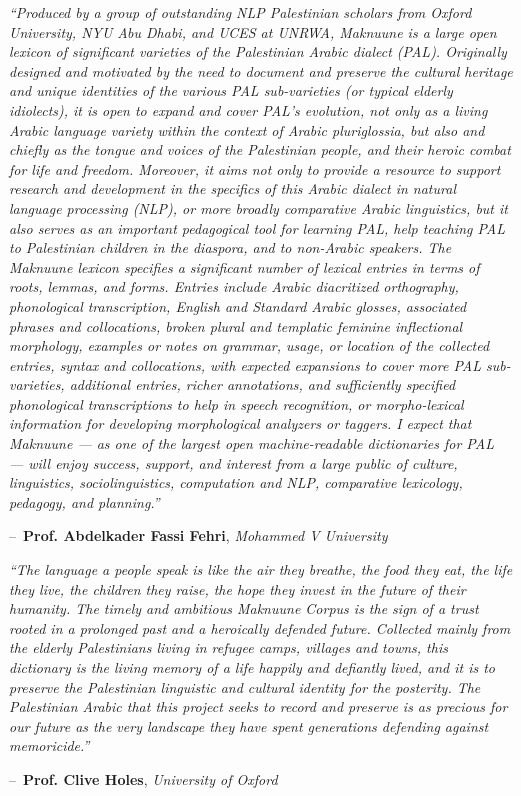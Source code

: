\documentclass[11pt]{book}
\makeatletter
\newenvironment{chapquote}[2][2em]
  {\setlength{\@tempdima}{#1}%
   \def\chapquote@author{#2}%
   \parshape 1 \@tempdima \dimexpr\textwidth-2\@tempdima\relax%
   \itshape}
  {\par\normalfont\hfill--\ \chapquote@author\hspace*{\@tempdima}\par\bigskip}
\makeatother
\begin{document}
\begin{chapquote}{\textbf{Prof.  Abdelkader Fassi Fehri}, \textit{Mohammed V University
}}
``Produced by a group of outstanding NLP Palestinian scholars from Oxford University, NYU Abu Dhabi, and UCES at UNRWA, Maknuune is a large open lexicon of significant varieties of the Palestinian Arabic dialect (PAL). Originally designed and motivated by the need to document and preserve the cultural heritage and unique identities of the various PAL sub-varieties (or typical elderly idiolects), it is open to expand and cover PAL’s evolution, not only as a living Arabic language variety within the context of Arabic pluriglossia, but also and chiefly as the tongue and voices of the Palestinian people, and their heroic combat for life and freedom. Moreover, it aims not only to provide a resource to support research and development in the specifics of this Arabic dialect in natural language processing (NLP), or more broadly comparative Arabic linguistics, but it also serves as an important pedagogical tool for learning PAL, help teaching PAL to Palestinian children in the diaspora, and to non-Arabic speakers.
The Maknuune lexicon specifies a significant number of lexical entries in terms of roots, lemmas, and forms. Entries include Arabic diacritized orthography, phonological transcription, English and Standard Arabic glosses, associated phrases and collocations, broken plural and templatic feminine inflectional morphology, examples or notes on grammar, usage, or location of the collected entries, syntax and collocations, with expected expansions to cover more PAL sub-varieties, additional entries, richer annotations, and sufficiently specified phonological transcriptions to help in speech recognition, or morpho-lexical information for developing morphological analyzers or taggers.  
I expect that Maknuune — as one of the largest open machine-readable dictionaries for PAL — will enjoy success, support, and interest from a large public of culture, linguistics, sociolinguistics, computation and NLP, comparative lexicology, pedagogy, and planning.''
\end{chapquote}

\vspace{5mm}
\thispagestyle{empty}

\begin{chapquote}{\textbf{Prof. Clive Holes}, \textit{University of Oxford
}}
``The language a people speak is like the air they breathe, the food they eat, the life they live, the children they raise, the hope they invest in the future of their humanity. The timely and ambitious Maknuune Corpus is the sign of a trust rooted in a prolonged past and a heroically defended future. Collected mainly from the elderly Palestinians living in refugee camps, villages and towns, this dictionary is the living memory of a life happily and defiantly lived, and it is to preserve the Palestinian linguistic and cultural identity for the posterity. The Palestinian Arabic that this project seeks to record and preserve is as precious for our future as the very landscape they have spent generations defending against memoricide.''
\end{chapquote}
\end{document}
